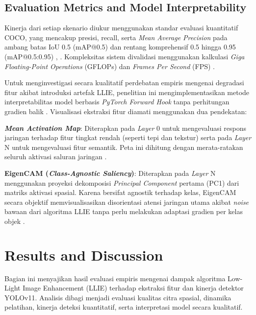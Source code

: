 \documentclass[conference]{IEEEtran}
\begin{document}
\subsection{Evaluation Metrics and Model Interpretability} Kinerja dari setiap skenario diukur menggunakan standar evaluasi kuantitatif COCO, yang mencakup presisi, recall, serta \textit{Mean Average Precision} pada ambang batas IoU 0.5 (mAP@0.5) dan rentang komprehensif 0.5 hingga 0.95 (mAP@0.5:0.95) \cite{report2026internal}, \cite{metrics2026formulas}. Kompleksitas sistem divalidasi menggunakan kalkulasi \textit{Giga Floating-Point Operations} (GFLOPs) dan \textit{Frames Per Second} (FPS) \cite{metrics2026formulas}.

Untuk menginvestigasi secara kualitatif perdebatan empiris mengenai degradasi fitur akibat introduksi artefak LLIE, penelitian ini mengimplementasikan metode interpretabilitas model berbasis \textit{PyTorch Forward Hook} tanpa perhitungan gradien balik \cite{metrics2026formulas}. Visualisasi ekstraksi fitur diamati menggunakan dua pendekatan:

\textbf{\textit{Mean Activation Map}}: Diterapkan pada \textit{Layer} 0 untuk mengevaluasi respons jaringan terhadap fitur tingkat rendah (seperti tepi dan tekstur) serta pada \textit{Layer} N untuk mengevaluasi fitur semantik. Peta ini dihitung dengan merata-ratakan seluruh aktivasi saluran jaringan \cite{metrics2026formulas}.

\textbf{EigenCAM (\textit{Class-Agnostic Saliency})}: Diterapkan pada \textit{Layer} N menggunakan proyeksi dekomposisi \textit{Principal Component} pertama (PC1) dari matriks aktivasi spasial. Karena bersifat agnostik terhadap kelas, EigenCAM secara objektif memvisualisasikan disorientasi atensi jaringan utama akibat \textit{noise} bawaan dari algoritma LLIE tanpa perlu melakukan adaptasi gradien per kelas objek \cite{metrics2026formulas}.


\section{Results and Discussion}
Bagian ini menyajikan hasil evaluasi empiris mengenai dampak algoritma Low-Light Image Enhancement (LLIE) terhadap ekstraksi fitur dan kinerja detektor YOLOv11. Analisis dibagi menjadi evaluasi kualitas citra spasial, dinamika pelatihan, kinerja deteksi kuantitatif, serta interpretasi model secara kualitatif.
\end{document}
